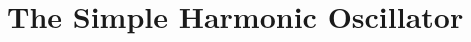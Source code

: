 \newcommand{\dif}{\mathop{}\!\mathrm{d}}
\newcommand{\al}{\alpha}
\newcommand{\bt}{\beta}
\newcommand{\om}{\omega}
\newcommand{\gm}{\gamma}
\newcommand{\lb}{\lambda}
\newcommand{\lm}{\lambda_-}
\newcommand{\lp}{\lambda_+}
\newcommand{\thw}{\theta_w}
\newcommand{\thp}{\theta_\phi}
\newcommand{\tht}{\theta}

\newcommand{\etp}{e_{t+}}
\newcommand{\etm}{e_{t-}}

\newcommand{\esp}{e_{x+}}
\newcommand{\esm}{e_{x-}}

\newcommand{\dsp}{\delta_{x+}}
\newcommand{\dsm}{\delta_{x-}}
\newcommand{\dsd}{\delta_{x\cdot}}
\newcommand{\dss}{\delta_{xx}}
\newcommand{\dssss}{\delta_{xxxx}}

\newcommand{\dtp}{\delta_{t+}}
\newcommand{\dtm}{\delta_{t-}}
\newcommand{\dtd}{\delta_{t\cdot}}
\newcommand{\dtt}{\delta_{tt}}
\newcommand{\dtttt}{\delta_{tttt}}
\newcommand{\dspm}{\delta_{x\pm}}

\newcommand{\mtp}{\mu_{t+}}
\newcommand{\mtm}{\mu_{t-}}
\newcommand{\mtd}{\mu_{t\cdot}}
\newcommand{\mtt}{\mu_{tt}}

\newcommand{\norm}[1]{\left\|#1\right\|}
\newcommand{\innp}[1]{\left\langle#1\right\rangle}
\newcommand{\virg}[1]{``#1''}


\chapter{The Simple Harmonic Oscillator}\label{chap:SHO}

